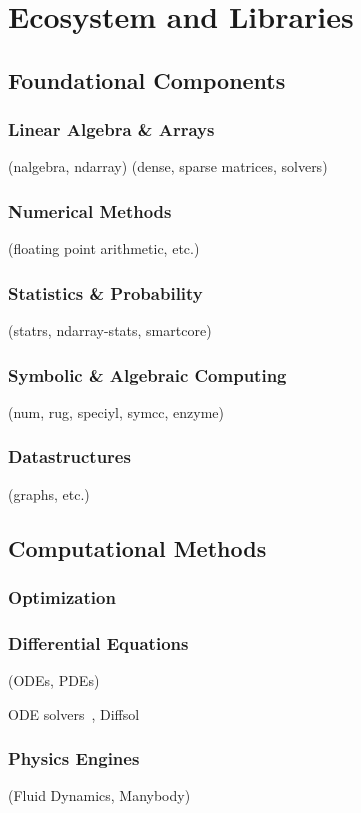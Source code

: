 \documentclass{article}
\begin{document}
\section{Ecosystem and Libraries}

\subsection{Foundational Components}
\subsubsection{Linear Algebra \& Arrays}
(nalgebra, ndarray) (dense, sparse matrices, solvers)

\subsubsection{Numerical Methods}
(floating point arithmetic, etc.)

\subsubsection{Statistics \& Probability}
(statrs, ndarray-stats, smartcore)

\subsubsection{Symbolic \& Algebraic Computing}
(num, rug, speciyl, symcc, enzyme)

\subsubsection{Datastructures}
(graphs, etc.)

\subsection{Computational Methods}
\subsubsection{Optimization}
\subsubsection{Differential Equations}
(ODEs, PDEs)

ODE solvers~\cite{Renevey2024}, Diffsol

\subsubsection{Physics Engines}
(Fluid Dynamics, Manybody)
\end{document}
